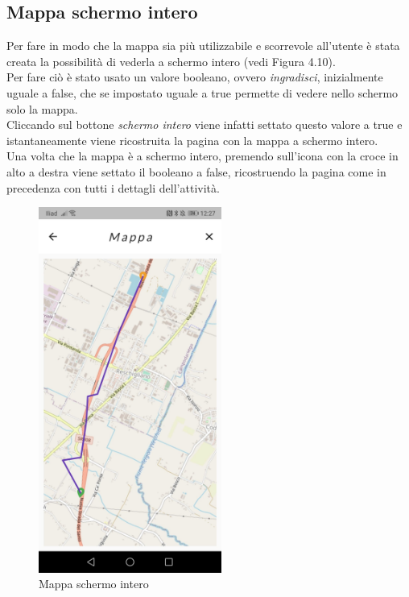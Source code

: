 \newpage

\subsection{Mappa schermo intero}
Per fare in modo che la mappa sia più utilizzabile e scorrevole all'utente è stata creata la possibilità di vederla a schermo intero (vedi Figura 4.10).\\
Per fare ciò è stato usato un valore booleano, ovvero \textit{ingradisci}, inizialmente uguale a false, che se impostato uguale a true permette di vedere nello schermo solo la mappa.\\
Cliccando sul bottone \textit{schermo intero} viene infatti settato questo valore a true e istantaneamente viene ricostruita la pagina con la mappa a schermo intero.\\
Una volta che la mappa è a schermo intero, premendo sull'icona con la croce in alto a destra viene settato il booleano a false, ricostruendo la pagina come in precedenza con tutti i dettagli dell'attività.\\

\begin{figure}[htbp]	
	\centering
	\includegraphics[width=6cm]{immagini/mappaintero.jpeg}
	\caption{Mappa schermo intero}
	\label{fig:Mappa schermo intero}
\end{figure}

\newpage

